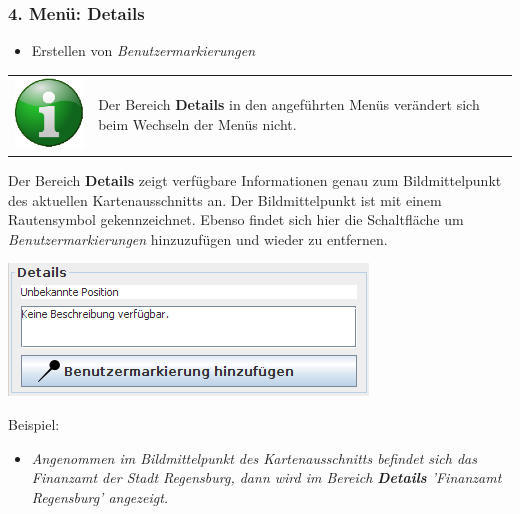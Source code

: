 \documentclass[10pt]{scrreprt}
\newcommand{\textref}[1]{\mbox{\raisebox{0.1ex}{\small$\rightarrow$ }\textit{#1}}}
\begin{document}
\vspace{5mm}
\subsubsection{4. Menü: Details}  

\begin{itemize}
\item Erstellen von \textref{Benutzermarkierungen}
\end{itemize}


\vspace{3mm}
\begin{tabular}{>{\centering \arraybackslash}m{1cm} m{14cm}}
\includegraphics[scale=0.5]{images/info.eps} & Der Bereich \textbf{Details} in den angeführten Menüs verändert sich beim Wechseln der Menüs nicht.
\end{tabular}

\vspace{5mm} 
\begin{minipage}[t]{9cm}
\vspace{-10mm}
Der Bereich \textbf{Details} zeigt verfügbare Informationen genau zum Bildmittelpunkt des aktuellen Kartenausschnitts an. Der Bildmittelpunkt ist mit einem Rautensymbol gekennzeichnet. Ebenso findet sich hier die Schaltfläche um \textref{Benutzermarkierungen} hinzuzufügen und wieder zu entfernen. \\
\end{minipage}
\begin{minipage}{7cm}
\centering
\includegraphics[scale=0.4]{images/details_menu.png}
\end{minipage}

\vspace{3mm}
Beispiel:
\begin{itemize} 
\item \textit{Angenommen im Bildmittelpunkt des Kartenausschnitts befindet sich das Finanzamt der Stadt Regensburg, dann wird im Bereich \textbf{Details} 'Finanzamt Regensburg' angezeigt.}
\end{itemize}
\end{document}
